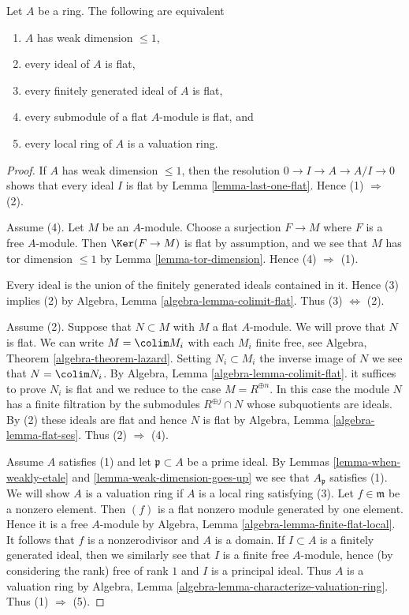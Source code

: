 \begin{lemma}
\label{lemma-weak-dimension-at-most-1}
Let $A$ be a ring. The following are equivalent
\begin{enumerate}
\item $A$ has weak dimension $\leq 1$,
\item every ideal of $A$ is flat,
\item every finitely generated ideal of $A$ is flat,
\item every submodule of a flat $A$-module is flat, and
\item every local ring of $A$ is a valuation ring.
\end{enumerate}
\end{lemma}

\begin{proof}
If $A$ has weak dimension $\leq 1$, then the resolution
$0 \to I \to A \to A/I \to 0$ shows that every ideal $I$
is flat by Lemma \ref{lemma-last-one-flat}.
Hence (1) $\Rightarrow$ (2).

\medskip\noindent
Assume (4). Let $M$ be an $A$-module. Choose a surjection
$F \to M$ where $F$ is a free $A$-module. Then $\Ker(F \to M)$
is flat by assumption, and we see that $M$ has tor dimension
$\leq 1$ by Lemma \ref{lemma-tor-dimension}.
Hence (4) $\Rightarrow$ (1).

\medskip\noindent
Every ideal is the union of the finitely generated ideals
contained in it. Hence (3) implies (2) by
Algebra, Lemma \ref{algebra-lemma-colimit-flat}.
Thus (3) $\Leftrightarrow$ (2).

\medskip\noindent
Assume (2). Suppose that $N \subset M$ with $M$ a flat $A$-module.
We will prove that $N$ is flat.
We can write $M = \colim M_i$ with each $M_i$ finite free, see
Algebra, Theorem \ref{algebra-theorem-lazard}.
Setting $N_i \subset M_i$ the inverse image of $N$ we see that
$N = \colim N_i$. By
Algebra, Lemma \ref{algebra-lemma-colimit-flat}.
it suffices to prove $N_i$ is flat and we reduce
to the case $M = R^{\oplus n}$. In this case
the module $N$ has a finite filtration by the submodules
$R^{\oplus j} \cap N$ whose subquotients are ideals.
By (2) these ideals are flat and hence $N$ is flat by
Algebra, Lemma \ref{algebra-lemma-flat-ses}. Thus (2) $\Rightarrow$ (4).

\medskip\noindent
Assume $A$ satisfies (1) and let $\mathfrak p \subset A$ be a
prime ideal. By
Lemmas \ref{lemma-when-weakly-etale} and \ref{lemma-weak-dimension-goes-up}
we see that $A_\mathfrak p$ satisfies (1). We will show $A$ is a valuation ring
if $A$ is a local ring satisfying (3). Let $f \in \mathfrak m$
be a nonzero element. Then $(f)$ is a flat nonzero module generated by
one element. Hence it is a free $A$-module by
Algebra, Lemma \ref{algebra-lemma-finite-flat-local}.
It follows that $f$ is a nonzerodivisor and $A$ is a domain.
If $I \subset A$ is a finitely generated ideal, then we similarly
see that $I$ is a finite free $A$-module, hence (by considering the
rank) free of rank $1$ and $I$ is a principal ideal. Thus $A$ is a
valuation ring by
Algebra, Lemma \ref{algebra-lemma-characterize-valuation-ring}.
Thus (1) $\Rightarrow$ (5).


\end{proof}
